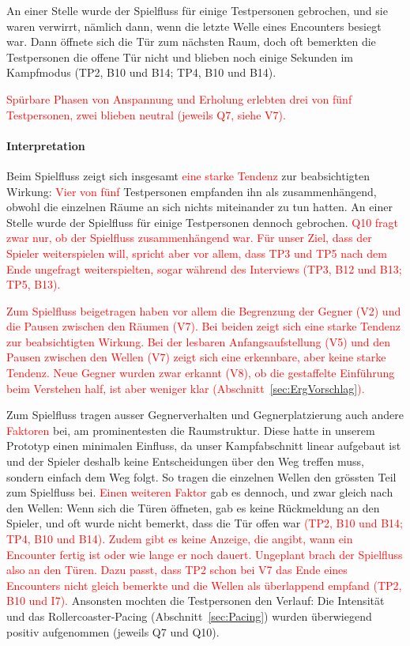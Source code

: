 \documentclass[../Main.tex]{subfiles}
\begin{document}
An einer Stelle wurde der Spielfluss für einige Testpersonen gebrochen, und sie waren verwirrt, nämlich dann, wenn die letzte Welle eines Encounters besiegt war. Dann öffnete sich die Tür zum nächsten Raum, doch oft bemerkten die Testpersonen die offene Tür nicht und blieben noch einige Sekunden im Kampfmodus (TP2, B10 und B14; TP4, B10 und B14).

\textcolor{red}{Spürbare Phasen von Anspannung und Erholung erlebten drei von fünf Testpersonen, zwei blieben neutral (jeweils Q7, siehe V7).}

\paragraph{Interpretation}
Beim Spielfluss zeigt sich insgesamt \textcolor{red}{eine starke Tendenz} zur beabsichtigten Wirkung: \textcolor{red}{Vier von fünf} Testpersonen empfanden ihn als zusammenhängend, obwohl die einzelnen Räume an sich nichts miteinander zu tun hatten. An einer Stelle wurde der Spielfluss für einige Testpersonen dennoch gebrochen. \textcolor{red}{Q10 fragt zwar nur, ob der Spielfluss zusammenhängend war. Für unser Ziel, dass der Spieler weiterspielen will, spricht aber vor allem, dass TP3 und TP5 nach dem Ende ungefragt weiterspielten, sogar während des Interviews (TP3, B12 und B13; TP5, B13).}

\textcolor{red}{Zum Spielfluss beigetragen haben vor allem die Begrenzung der Gegner (V2) und die Pausen zwischen den Räumen (V7). Bei beiden zeigt sich eine starke Tendenz zur beabsichtigten Wirkung. Bei der lesbaren Anfangsaufstellung (V5) und den Pausen zwischen den Wellen (V7) zeigt sich \textcolor{red}{eine erkennbare, aber keine starke Tendenz}. Neue Gegner wurden zwar erkannt (V8), ob die gestaffelte Einführung beim Verstehen half, ist aber weniger klar (Abschnitt~\ref{sec:ErgVorschlag}).}

Zum Spielfluss tragen ausser Gegnerverhalten und Gegnerplatzierung auch andere \textcolor{red}{Faktoren} bei, am prominentesten die Raumstruktur. Diese hatte in unserem Prototyp einen minimalen Einfluss, da unser Kampfabschnitt linear aufgebaut ist und der Spieler deshalb keine Entscheidungen über den Weg treffen muss, sondern einfach dem Weg folgt. So tragen die einzelnen Wellen den grössten Teil zum Spielfluss bei. \textcolor{red}{Einen weiteren Faktor} gab es dennoch, und zwar gleich nach den Wellen: Wenn sich die Türen öffneten, gab es keine Rückmeldung an den Spieler, und oft wurde nicht bemerkt, dass die Tür offen war \textcolor{red}{(TP2, B10 und B14; TP4, B10 und B14). Zudem gibt es keine Anzeige, die angibt, wann ein Encounter fertig ist oder wie lange er noch dauert. Ungeplant brach der Spielfluss also an den Türen. Dazu passt, dass TP2 schon bei V7 das Ende eines Encounters nicht gleich bemerkte und die Wellen als überlappend empfand (TP2, B10 und I7).} Ansonsten mochten die Testpersonen den Verlauf: Die Intensität und das Rollercoaster-Pacing (Abschnitt~\ref{sec:Pacing}) wurden überwiegend positiv aufgenommen (jeweils Q7 und Q10).
\end{document}
